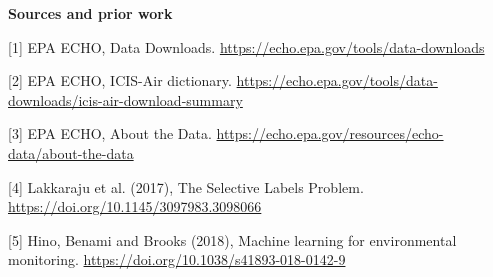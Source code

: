 \documentclass[10pt,letterpaper]{article}
\begin{document}
\small\textbf{Sources and prior work}\par
{\raggedright
{[1]} EPA ECHO, Data Downloads. \url{https://echo.epa.gov/tools/data-downloads}\par
{[2]} EPA ECHO, ICIS-Air dictionary. \url{https://echo.epa.gov/tools/data-downloads/icis-air-download-summary}\par
{[3]} EPA ECHO, About the Data. \url{https://echo.epa.gov/resources/echo-data/about-the-data}\par
{[4]} Lakkaraju et al. (2017), The Selective Labels Problem. \url{https://doi.org/10.1145/3097983.3098066}\par
{[5]} Hino, Benami and Brooks (2018), Machine learning for environmental monitoring. \url{https://doi.org/10.1038/s41893-018-0142-9}\par}
\end{document}
